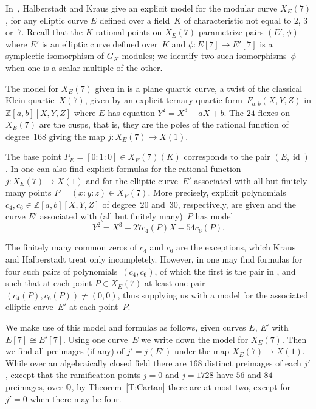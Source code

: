 \documentclass[12pt]{amsart}
\newcommand{\Q}{\mathbb{Q}}
\newcommand{\Z}{\mathbb{Z}}
\DeclareMathOperator{\id}{id}
\numberwithin{equation}{section}
\theoremstyle{definition}
\theoremstyle{remark}
\begin{document}
In~\cite{Halberstadt-Kraus-XE7}, Halberstadt and Kraus give an
explicit model for the modular curve $X_E(7)$, for any elliptic curve
$E$ defined over a field~$K$ of characteristic not equal to $2$, $3$
or~$7$. Recall that the $K$-rational points on $X_E(7)$ parametrize
pairs $(E',\phi)$ where $E'$ is an elliptic curve defined over~$K$ and
$\phi:E[7]\to E'[7]$ is a symplectic isomorphism of $G_K$-modules; we
identify two such isomorphisms~$\phi$ when one is a scalar multiple of
the other.

The model for $X_E(7)$ given in \cite{Halberstadt-Kraus-XE7} is a
plane quartic curve, a twist of the classical Klein quartic~$X(7)$,
given by an explicit ternary quartic form~$F_{a,b}(X,Y,Z)$ in
$\Z[a,b][X,Y,Z]$ where $E$ has equation $Y^2=X^3+aX+b$.  The $24$
flexes on $X_E(7)$ are the cusps, that is, they are the poles of the
rational function of degree~$168$ giving the map $j:X_E(7)\to
X(1)$.

The base point $P_E=[0:1:0]\in X_E(7)(K)$ corresponds to the pair
$(E,\id)$.  In \cite{Halberstadt-Kraus-XE7} one can also find explicit formulas
for the rational function $j:X_E(7)\to X(1)$ and for the elliptic curve~$E'$
associated with all 
but finitely many points $P=(x:y:z)\in
X_E(7)$. More precisely, 
explicit polynomials $c_4, c_6 \in \Z[a,b][X,Y,Z]$
of degree~$20$ and~$30$, respectively, are given and the curve $E'$ associated with (all but finitely many)~$P$ has model
\[Y^2=X^3-27c_4(P)X-54c_6(P).\]

The finitely many common zeros of $c_4$
and $c_6$ are the exceptions, which Kraus and Halberstadt treat only
incompletely.  However, in \cite{Fisher} one may find formulas for
four such pairs of polynomials~$(c_4,c_6)$, of which the first is the pair in
\cite{Halberstadt-Kraus-XE7}, and such that at each point $P\in
X_E(7)$ at least one pair $(c_4(P),c_6(P))\not=(0,0)$, thus supplying
us with a model for the associated elliptic 
curve~$E'$ at each point~$P$.

We make use of this model and formulas as follows, given curves $E$,
$E'$ with $E[7]\cong E'[7]$.  Using one curve~$E$ we write down the
model for $X_E(7)$.  Then we find all preimages (if any) of $j'=j(E')$
under the map $X_E(7)\to X(1)$.  While over an algebraically closed
field there are $168$ distinct preimages of each $j'$, except that the
ramification points $j=0$ and $j=1728$ have $56$ and $84$ preimages,
over $\Q$, by Theorem~\ref{T:Cartan} there are at most two, except
for $j'=0$ when there may be four.
\end{document}
